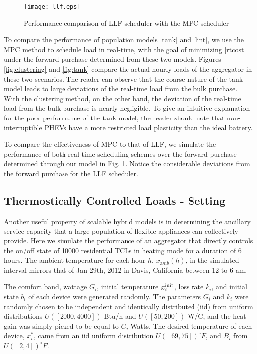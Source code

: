 \documentclass[10pt]{IEEEtran}
\begin{document}
\begin{figure}
\centering
\texttt{[image: llf.eps]} 
\caption{Performance comparison of LLF scheduler with the MPC scheduler}
\label{fig:llf}
\end{figure}

To compare the performance of population models \eqref{tank} and \eqref{lint}, we use the MPC method to schedule load in real-time, with the goal of minimizing \eqref{rtcost} under the forward purchase determined from these two models.
Figures  \ref{fig:clustering} and \ref{fig:tank} compare the actual hourly loads of the aggregator in these two scenarios. The reader can observe that the coarse nature of the tank model leads to large deviations of the real-time load from the bulk purchase. With the clustering method, on the other hand,  the deviation of the real-time load from the bulk purchase is nearly negligible. 
To give an intuitive explanation for the poor performance of the tank model, the reader should note that non-interruptible PHEVs have a more restricted load plasticity than the ideal battery. 


To compare the effectiveness of MPC to that of LLF, we simulate the performance of both real-time scheduling schemes over the forward purchase determined through our model in Fig. \ref{fig:llf}. Notice the considerable deviations from the forward purchase for the LLF scheduler.


\subsection{Thermostically Controlled Loads - Setting}
Another useful property of scalable hybrid models is in determining the ancillary service capacity that a large population of flexible appliances can collectively provide. 
Here we simulate the performance of an aggregator that directly controls the on/off state of 10000 residential TCLs in heating mode for a duration of 6 hours. The ambient temperature for each hour $h$, $x_{{\mathrm amb}}(h)$, in the simulated interval mirrors that of Jan 29th, 2012 in Davis, California between 12 to 6 am. 

The comfort band, wattage $G_i$, initial temperature $x_i^{\rm init}$, loss rate $k_i$, and initial state $b_i$ of each device were generated randomly. The parameters $G_i$ and $k_i$ were randomly chosen to be independent and identically distributed (iid) from  uniform distributions $U([2000,4000])$ Btu/h and $U([50,200])$ W/C, and the heat gain was simply picked to be equal to $G_i$ Watts. The desired temperature of each device, $x^*_i$, came from an iid uniform distribution $U([69,75])^{\circ}F$, and $B_i$ from $U([2,4])^{\circ}F$. 
\end{document}
